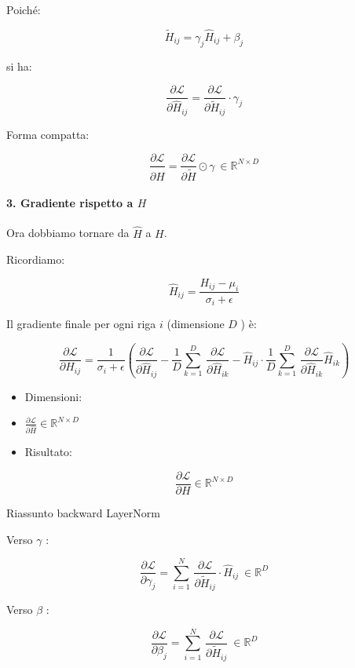 \documentclass[
  11pt,
]{article}
\begin{document}
Poiché:

\[{\widetilde{H}}_{ij} = \gamma_{j}{\widehat{H}}_{ij} + \beta_{j}\]

si ha:

\[\frac{\partial\mathcal{L}}{\partial{\widehat{H}}_{ij}} = \frac{\partial\mathcal{L}}{\partial{\widetilde{H}}_{ij}} \cdot \gamma_{j}\]

Forma compatta:

\[\frac{\partial\mathcal{L}}{\partial\widehat{H}} = \frac{\partial\mathcal{L}}{\partial\widetilde{H}} \odot \gamma\  \in \mathbb{R}^{N \times D}\]

\paragraph{3. Gradiente rispetto a $H$}

Ora dobbiamo tornare da \(\widehat{H}\) a \(H\).

Ricordiamo:

\[{\widehat{H}}_{ij} = \frac{H_{ij} - \mu_{i}}{\sigma_{i} + \epsilon}\]

Il gradiente finale per ogni riga \(i\) (dimensione \(D\) ) è:

\[\frac{\partial\mathcal{L}}{\partial H_{ij}} = \frac{1}{\sigma_{i} + \epsilon}\left( \frac{\partial\mathcal{L}}{\partial{\widehat{H}}_{ij}} - \frac{1}{D}\sum_{k = 1}^{D}\,\frac{\partial\mathcal{L}}{\partial{\widehat{H}}_{ik}} - {\widehat{H}}_{ij} \cdot \frac{1}{D}\sum_{k = 1}^{D}\,\frac{\partial\mathcal{L}}{\partial{\widehat{H}}_{ik}}{\widehat{H}}_{ik} \right)\]

\begin{itemize}
\item
  Dimensioni:
\item
  \(\frac{\partial\mathcal{L}}{\partial\widehat{H}} \in \mathbb{R}^{N \times D}\)
\item
  Risultato:
\end{itemize}

\[\frac{\partial\mathcal{L}}{\partial H} \in \mathbb{R}^{N \times D}\]

Riassunto backward LayerNorm

Verso \(\gamma\) :

\[\frac{\partial\mathcal{L}}{\partial\gamma_{j}} = \sum_{i = 1}^{N}\,\frac{\partial\mathcal{L}}{\partial{\widetilde{H}}_{ij}} \cdot {\widehat{H}}_{ij}\  \in \mathbb{R}^{D}\]

Verso \(\beta\) :

\[\frac{\partial\mathcal{L}}{\partial\beta_{j}} = \sum_{i = 1}^{N}\,\frac{\partial\mathcal{L}}{\partial{\widetilde{H}}_{ij}}\  \in \mathbb{R}^{D}\]
\end{document}
